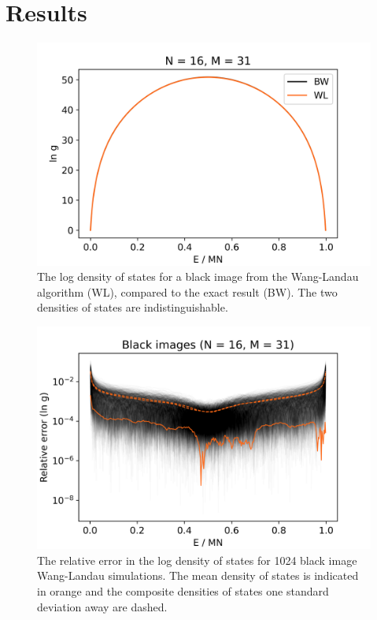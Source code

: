 \documentclass[aps,reprint]{revtex4-2}
\theoremstyle{plain}
\theoremstyle{definition}
\begin{document}
\section{Results}

\begin{figure}
  \centering
  \includegraphics[width=\linewidth]{wanglandau-bw}
  \caption{The log density of states for a black image from the Wang-Landau
    algorithm (WL), compared to the exact result (BW). The two densities of
  states are indistinguishable.}\label{fig:wl-bw}
\end{figure}

\begin{figure}
  \centering
  \includegraphics[width=\linewidth]{wanglandau-bw-relerror}
  \caption{The relative error in the log density of states for \num{1024} black
    image Wang-Landau simulations. The mean density of states is indicated
    in orange and the composite densities of states one standard deviation away
  are dashed.}\label{fig:wl-bw-relerror}
\end{figure}
\end{document}
